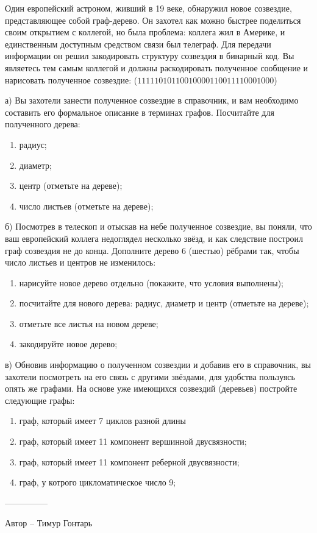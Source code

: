 \question
Один европейский астроном, живший в 19 веке, обнаружил новое созвездие, представляющее собой граф-дерево. Он захотел как можно быстрее поделиться своим открытием с коллегой, но была проблема: коллега жил в Америке, и единственным доступным средством связи был телеграф. Для передачи информации он решил закодировать структуру созвездия в бинарный код. Вы являетесь тем самым коллегой и должны раскодировать полученное сообщение и нарисовать полученное созвездие: ($11111010110010000110011110001000$)

а) Вы захотели занести полученное созвездие в справочник, и вам необходимо составить его формальное описание в терминах графов. Посчитайте для полученного дерева:
\begin{enumerate}
\item радиус;
\item диаметр;
\item центр (отметьте на дереве);
\item число листьев (отметьте на дереве);
\end{enumerate}

б) Посмотрев в телескоп и отыскав на небе полученное созвездие, вы поняли, что ваш европейский коллега недоглядел несколько звёзд, и как следствие построил граф созвездия не до конца. Дополните дерево 6 (шестью) рёбрами так, чтобы число листьев и центров не изменилось:
\begin{enumerate}
\item нарисуйте новое дерево отдельно (покажите, что условия выполнены);
\item посчитайте для нового дерева: радиус, диаметр и центр (отметьте на дереве);
\item отметьте все листья на новом дереве;
\item закодируйте новое дерево;
\end{enumerate}

в) Обновив информацию о полученном созвездии и добавив его в справочник, вы захотели посмотреть на его связь с другими звёздами, для удобства пользуясь опять же графами. На основе уже имеющихся созвездий (деревьев) постройте следующие графы:
\begin{enumerate}
\item граф, который имеет 7 циклов разной длины
\item граф, который имеет 11 компонент вершинной двусвязности;
\item граф, который имеет 11 компонент реберной двусвязности;
\item граф, у котрого цикломатическое число 9;
\end{enumerate}

---------------

Автор -- Тимур Гонтарь
